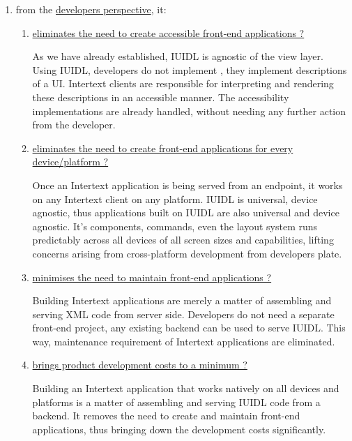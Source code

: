 \begin{enumerate}
\begin{enumerate}
  \end{enumerate}
  \item from the \underline{developers perspective}, it:
  \begin{enumerate}
    \item \underline{ eliminates the need to create accessible front-end applications ?}

    As we have already established, IUIDL is agnostic of the view layer. Using IUIDL, developers do not implement , they implement descriptions of a UI. Intertext clients are responsible for interpreting and rendering these descriptions in an accessible manner. The accessibility implementations are already handled, without needing any further action from the developer.
    
    \item \underline{eliminates the need to create front-end applications for every} \newline \underline{device/platform ?}

    Once an Intertext application is being served from an endpoint, it works on any Intertext client on any platform. IUIDL is universal, device agnostic, thus applications built on IUIDL are also universal and device agnostic. It's components, commands, even the layout system runs predictably across all devices of all screen sizes and capabilities, lifting concerns arising from cross-platform development from developers plate.
    
    \item \underline{minimises the need to maintain front-end applications ?}

    Building Intertext applications are merely a matter of assembling and serving XML code from server side. Developers do not need a separate front-end project, any existing backend can be used to serve IUIDL. This way, maintenance requirement of Intertext applications are eliminated.
    
    \item \underline{brings product development costs to a minimum ?}

    Building an Intertext application that works natively on all devices and platforms is a matter of assembling and serving IUIDL code from a backend. It removes the need to create and maintain front-end applications, thus bringing down the development costs significantly.
    
  \end{enumerate}
\end{enumerate}


